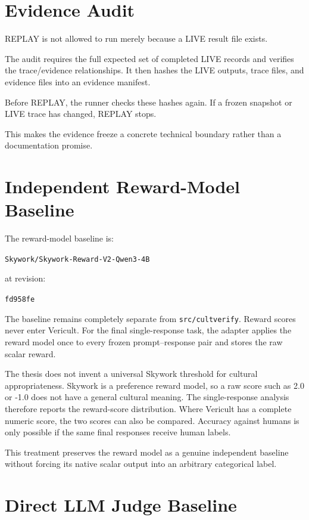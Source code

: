 \section{Evidence Audit}

REPLAY is not allowed to run merely because a LIVE result file exists.

The audit requires the full expected set of completed LIVE records and verifies the trace/evidence relationships. It then hashes the LIVE outputs, trace files, and evidence files into an evidence manifest.

Before REPLAY, the runner checks these hashes again. If a frozen snapshot or LIVE trace has changed, REPLAY stops.

This makes the evidence freeze a concrete technical boundary rather than a documentation promise.

\section{Independent Reward-Model Baseline}

The reward-model baseline is:

\begin{center}
\texttt{Skywork/Skywork-Reward-V2-Qwen3-4B}
\end{center}

at revision:

\begin{center}
\texttt{fd958fe}
\end{center}

The baseline remains completely separate from \texttt{src/cultverify}. Reward scores never enter Vericult. For the final single-response task, the adapter applies the reward model once to every frozen prompt--response pair and stores the raw scalar reward.

The thesis does not invent a universal Skywork threshold for cultural appropriateness. Skywork is a preference reward model, so a raw score such as 2.0 or -1.0 does not have a general cultural meaning. The single-response analysis therefore reports the reward-score distribution. Where Vericult has a complete numeric score, the two scores can also be compared. Accuracy against humans is only possible if the same final responses receive human labels.

This treatment preserves the reward model as a genuine independent baseline without forcing its native scalar output into an arbitrary categorical label.

\section{Direct LLM Judge Baseline}

